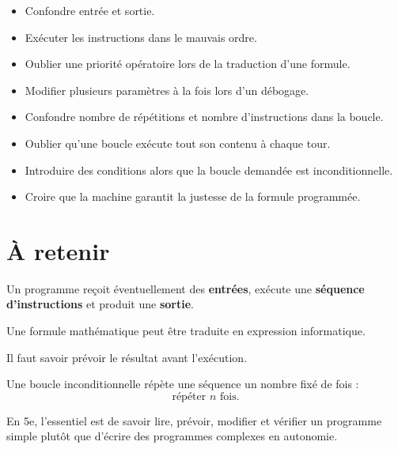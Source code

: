 \begin{itemize}
\item Confondre entrée et sortie.
\item Exécuter les instructions dans le mauvais ordre.
\item Oublier une priorité opératoire lors de la traduction d'une formule.
\item Modifier plusieurs paramètres à la fois lors d'un débogage.
\item Confondre nombre de répétitions et nombre d'instructions dans la boucle.
\item Oublier qu'une boucle exécute tout son contenu à chaque tour.
\item Introduire des conditions alors que la boucle demandée est inconditionnelle.
\item Croire que la machine garantit la justesse de la formule programmée.
\end{itemize}

\section{À retenir}

\begin{aretenir}
Un programme reçoit éventuellement des \textbf{entrées}, exécute une \textbf{séquence d'instructions} et produit une \textbf{sortie}.

Une formule mathématique peut être traduite en expression informatique.

Il faut savoir prévoir le résultat avant l'exécution.

Une boucle inconditionnelle répète une séquence un nombre fixé de fois :
\[
\boxed{\text{répéter }n\text{ fois}}.
\]

En 5e, l'essentiel est de savoir lire, prévoir, modifier et vérifier un programme simple plutôt que d'écrire des programmes complexes en autonomie.
\end{aretenir}
